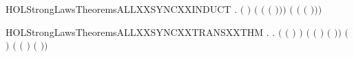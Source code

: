 \newcommand{\HOLStrongLawsTheoremsALLXXSYNCXXcompute}{\UseVerbatim{HOLStrongLawsTheoremsALLXXSYNCXXcompute}}
\begin{SaveVerbatim}{HOLStrongLawsTheoremsALLXXSYNCXXINDUCT}
\HOLTokenTurnstile{} \HOLSymConst{\HOLTokenForall{}}   .
         \ensuremath{(} \ensuremath{)}   \HOLSymConst{\ensuremath{=}}
            \HOLSymConst{\ensuremath{+}}
        \ensuremath{(} \ensuremath{(} \ensuremath{(} \ensuremath{)}\ensuremath{)}\ensuremath{)} \ensuremath{(} \ensuremath{(} \ensuremath{(} \ensuremath{)}\ensuremath{)}\ensuremath{)}  
\end{SaveVerbatim}
\newcommand{\HOLStrongLawsTheoremsALLXXSYNCXXINDUCT}{\UseVerbatim{HOLStrongLawsTheoremsALLXXSYNCXXINDUCT}}
\begin{SaveVerbatim}{HOLStrongLawsTheoremsALLXXSYNCXXTRANSXXTHM}
\HOLTokenTurnstile{} \HOLSymConst{\HOLTokenForall{}}     .
            \HOLTokenTransBegin{}\HOLTokenTransEnd {} \HOLSymConst{\HOLTokenImp{}}
       \HOLSymConst{\HOLTokenExists{}}  .
            \HOLSymConst{\HOLTokenLeq{}}  \HOLSymConst{\HOLTokenConj{}}  \HOLSymConst{\HOLTokenLeq{}}  \HOLSymConst{\HOLTokenConj{}} \ensuremath{(} \ensuremath{(} \ensuremath{)} \HOLSymConst{\ensuremath{=}}  \ensuremath{)} \HOLSymConst{\HOLTokenConj{}}
           \ensuremath{(} \ensuremath{(} \ensuremath{)} \HOLSymConst{\ensuremath{=}}  \ensuremath{(} \ensuremath{)}\ensuremath{)} \HOLSymConst{\HOLTokenConj{}} \ensuremath{(} \HOLSymConst{\ensuremath{=}} \HOLConst{\ensuremath{\tau}}\ensuremath{)} \HOLSymConst{\HOLTokenConj{}}
           \ensuremath{(} \HOLSymConst{\ensuremath{=}}  \ensuremath{(} \ensuremath{)} \HOLSymConst{\ensuremath{\mid}}  \ensuremath{(} \ensuremath{)}\ensuremath{)}
\end{SaveVerbatim}
